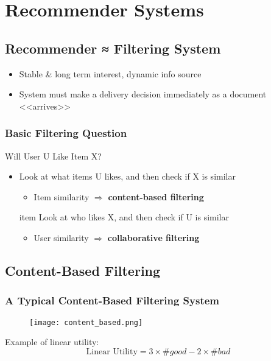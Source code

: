 \newpage
\section{Recommender Systems}
\subsection{Recommender ≈ Filtering System}
\begin{itemize}
\item Stable \& long term interest, dynamic info source
\item System must make a delivery decision immediately as a document <<arrives>>
\end{itemize}


\subsubsection{Basic Filtering Question}
Will User U Like Item X?
\begin{itemize}
\item Look at what items U likes, and then check if X is similar 
\begin{itemize}
\item Item similarity $\Rightarrow$ \textbf{content-based filtering}
\end{itemize}

item Look at who likes X, and then check if U is similar 
\begin{itemize}
\item User similarity $\Rightarrow$ \textbf{collaborative filtering}
\end{itemize}
\end{itemize}

\subsection{Content-Based Filtering}

\subsubsection{A Typical Content-Based Filtering System}
\begin{figure}[H]
    \centering
    \texttt{[image: content\_based.png]}
\end{figure}

Example of linear utility: 
\begin{equation*}
\text{Linear Utility} = 3 \times \#good - 2 \times \#bad
\end{equation*}


